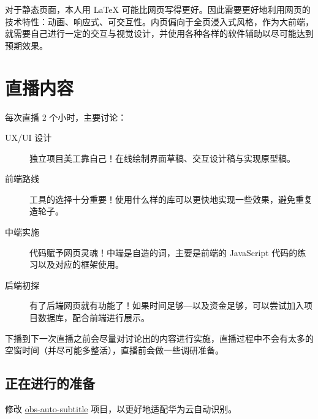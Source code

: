 \documentclass[UTF8]{ctexart}
\begin{document}
    对于静态页面，本人用 \LaTeX{} 可能比网页写得更好。因此需要更好地利用网页的技术特性：动画、响应式、可交互性。内页偏向于全页浸入式风格，作为大前端，就需要自己进行一定的交互与视觉设计，并使用各种各样的软件辅助以尽可能达到预期效果。


\section{直播内容}

    每次直播 2 个小时，主要讨论：
    \begin{description}
        \item[UX/UI 设计] 独立项目美工靠自己！在线绘制界面草稿、交互设计稿与实现原型稿。
        \item[前端路线] 工具的选择十分重要！使用什么样的库可以更快地实现一些效果，避免重复造轮子。
        \item[中端实施] 代码赋予网页灵魂！中端是自造的词，主要是前端的 JavaScript 代码的练习以及对应的框架使用。
        \item[后端初探] 有了后端网页就有功能了！如果时间足够---以及资金足够，可以尝试加入项目数据库，配合前端进行展示。 
    \end{description}

    下播到下一次直播之前会尽量对讨论出的内容进行实施，直播过程中不会有太多的空窗时间（并尽可能多整活），直播前会做一些调研准备。

    \begin{figure}[h]
        \centering
    \end{figure}

\subsection*{正在进行的准备}
    修改 \href{https://gitee.com/LogCreative/obs-auto-subtitle}{obs-auto-subtitle} 项目，以更好地适配华为云自动识别。
\end{document}
